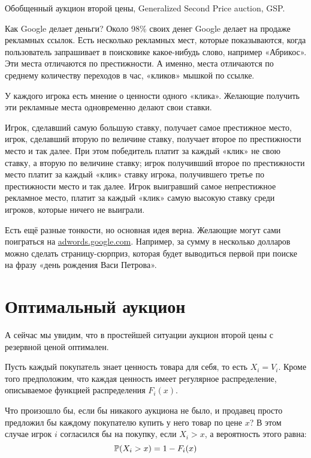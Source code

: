 \begin{myex} Обобщенный аукцион второй цены, Generalized Second Price auction, GSP.

Как Google делает деньги? Около 98\% своих денег Google делает на продаже рекламных ссылок. Есть несколько рекламных мест, которые показываются, когда пользователь запрашивает в поисковике какое-нибудь слово, например «Абрикос». Эти места отличаются по престижности. А именно, места отличаются по среднему количеству переходов в час, «кликов» мышкой по ссылке.

У каждого игрока есть мнение о ценности одного «клика». Желающие получить эти рекламные места одновременно делают свои ставки.

Игрок, сделавший самую большую ставку, получает самое престижное место, игрок, сделавший вторую по величине ставку, получает второе по престижности место и так далее.  При этом победитель платит за каждый «клик» не свою ставку, а вторую по величине ставку; игрок получивший второе по престижности место платит за каждый «клик» ставку игрока, получившего третье по престижности место и так далее. Игрок выигравший самое непрестижное рекламное место, платит за каждый «клик» самую высокую ставку среди игроков, которые ничего не выиграли.

Есть ещё разные тонкости, но основная идея верна. Желающие могут сами поиграться на \url{adwords.google.com}. Например, за сумму в несколько долларов можно сделать страницу-сюрприз, которая будет выводиться первой при поиске на фразу «день рождения Васи Петрова».
\end{myex}





\section{Оптимальный аукцион}

А сейчас мы увидим, что в простейшей ситуации аукцион второй цены с резервной ценой оптимален.

Пусть каждый покупатель знает ценность товара для себя, то есть  $ X_{i}=V_{i} $. Кроме того предположим, что каждая ценность имеет регулярное распределение, описываемое функцией распределения $ F_{i}(x) $.

Что произошло бы, если бы никакого аукциона не было, и продавец просто предложил бы каждому покупателю купить у него товар по цене $ x $? В этом случае игрок $ i $ согласился бы на покупку, если $ X_{i}>x $, а вероятность этого равна:
\begin{equation}
\P(X_{i}>x)=1-F_{i}(x)
\end{equation}

